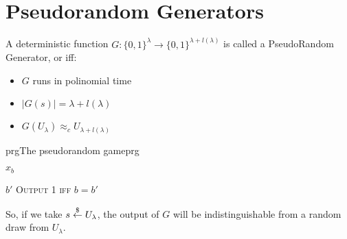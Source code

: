 \pagebreak

\section{Pseudorandom Generators}

A deterministic function $G:\{0,1\}^{\lambda} \to \{0,1\}^{\lambda + l(\lambda)} $ is called a PseudoRandom Generator, or \prg{} iff:
\begin{itemize}
    \item $G$ runs in polinomial time
    \item $|G(s)| = \lambda + l(\lambda)$ %
    \item $G(U_{\lambda}) \approx_{c} U_{\lambda + l(\lambda)}$
\end{itemize}

\begin{cryptogame}{prg}{The pseudorandom game}{prg}
    
    {$x_b$}
    {}

    \cseqdelay

    \send{}
    {$b'$}
    {\textsc{Output 1 iff} $b = b'$}
    
\end{cryptogame}

So, if we take $s \pickUAR U_{\lambda}$, the output of $G$ will be indistinguishable from a random draw from $U_{\lambda}$.
